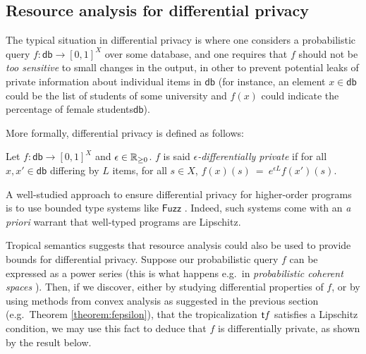 

\subsection{Resource analysis for differential privacy}

The typical situation in differential privacy is where one considers a probabilistic query $f: \mathsf{db}\to [0,1]^{X}$ over some database, and one requires that $f$ should not be \emph{too sensitive} to small changes in the output, in other to prevent potential leaks of private information about individual items in $\mathsf{db}$ (for instance, an element $x\in\mathsf{db}$ could be the list of students of some university and $f(x)$ could indicate the percentage of female students$\mathsf{db}$).

More formally, differential privacy is defined as follows:
\begin{definition}
Let $f: \mathsf{db}\to [0,1]^{X}$ and $\epsilon \in \mathbb{R}_{\geq 0}$. $f$ is said \emph{$\epsilon$-differentially private} if for all $x,x'\in \mathsf{db}$
differing by $L$ items, for all $s\in X$, 
$
f(x)(s) \ = \ e^{\epsilon L} f(x')(s)
$.
\end{definition}

A well-studied approach to ensure differential privacy for higher-order programs is to use bounded type systems like $\mathsf{Fuzz}$ \cite{Reed2010}. Indeed, such systems come with an \emph{a priori} warrant that well-typed programs are Lipschitz.

Tropical semantics suggests that resource analysis could also be used to provide bounds for differential privacy. 
Suppose our probabilistic query $f$ can be expressed as a power series (this is what happens e.g.~in \emph{probabilistic coherent spaces} \cite{Ehrhard2011}). Then, if we discover, either by studying differential properties of $f$, or by using methods from convex analysis as suggested in the previous section (e.g.~Theorem \ref{theorem:fepsilon}), 
 that the tropicalization $\mathsf{t} f$ satisfies a Lipschitz condition, we may use this fact to deduce that $f$ is differentially private, as shown by the result below.

%
%


